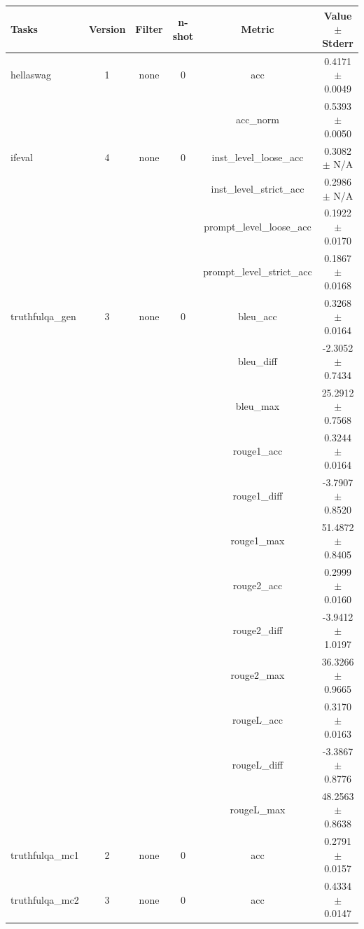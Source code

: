 \documentclass{ifacconf}
\begin{document}
\vfill
\clearpage
\pagebreak

\begin{strip}
\begin{minipage}{\textwidth}
    \begin{table}[H]
    \centering
    \begin{tabular}{|l|c|c|c|c|c|}
    \hline
    \textbf{Tasks} & \textbf{Version} & \textbf{Filter} & \textbf{n-shot} & \textbf{Metric} & \textbf{Value} $\pm$ \textbf{Stderr} \\ \hline
    hellaswag & 1 & none & 0 & acc & 0.4171 $\pm$ 0.0049 \\ \hline
    & & & & acc\_norm & 0.5393 $\pm$ 0.0050 \\ \hline
    ifeval & 4 & none & 0 & inst\_level\_loose\_acc & 0.3082 $\pm$ N/A \\ \hline
    & & & & inst\_level\_strict\_acc & 0.2986 $\pm$ N/A \\ \hline
    & & & & prompt\_level\_loose\_acc & 0.1922 $\pm$ 0.0170 \\ \hline
    & & & & prompt\_level\_strict\_acc & 0.1867 $\pm$ 0.0168 \\ \hline
    truthfulqa\_gen & 3 & none & 0 & bleu\_acc & 0.3268 $\pm$ 0.0164 \\ \hline
    & & & & bleu\_diff & -2.3052 $\pm$ 0.7434 \\ \hline
    & & & & bleu\_max & 25.2912 $\pm$ 0.7568 \\ \hline
    & & & & rouge1\_acc & 0.3244 $\pm$ 0.0164 \\ \hline
    & & & & rouge1\_diff & -3.7907 $\pm$ 0.8520 \\ \hline
    & & & & rouge1\_max & 51.4872 $\pm$ 0.8405 \\ \hline
    & & & & rouge2\_acc & 0.2999 $\pm$ 0.0160 \\ \hline
    & & & & rouge2\_diff & -3.9412 $\pm$ 1.0197 \\ \hline
    & & & & rouge2\_max & 36.3266 $\pm$ 0.9665 \\ \hline
    & & & & rougeL\_acc & 0.3170 $\pm$ 0.0163 \\ \hline
    & & & & rougeL\_diff & -3.3867 $\pm$ 0.8776 \\ \hline
    & & & & rougeL\_max & 48.2563 $\pm$ 0.8638 \\ \hline
    truthfulqa\_mc1 & 2 & none & 0 & acc & 0.2791 $\pm$ 0.0157 \\ \hline
    truthfulqa\_mc2 & 3 & none & 0 & acc & 0.4334 $\pm$ 0.0147 \\ \hline
    \end{tabular}
    \label{tab:gemma2_pruned}
    \end{table}


\end{minipage}
\end{strip}
\end{document}
